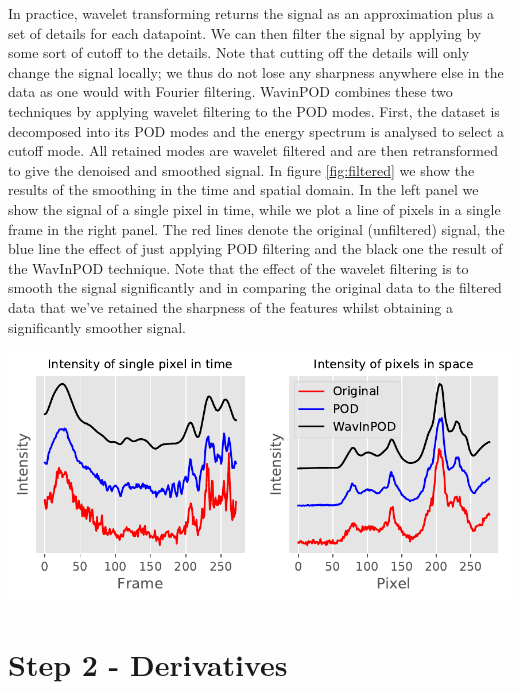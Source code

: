\documentclass{Dissertate}
\let\origfigure\figure
\let\endorigfigure\endfigure
\renewenvironment{figure}[1][2] {
    \expandafter\origfigure\expandafter[H]
} {
    \endorigfigure
}
\begin{document}
 In practice, wavelet transforming returns the signal as an approximation plus a set of details for each datapoint. We can then filter the signal by applying by some sort of cutoff to the details. Note that cutting off the details will only change the signal locally; we thus do not lose any sharpness anywhere else in the data as one would with Fourier filtering.
WavinPOD combines these two techniques by applying wavelet filtering to
the POD modes. First, the dataset is decomposed into its POD modes and the energy spectrum is analysed to select a cutoff mode. All retained
modes are wavelet filtered and are then retransformed to give the
denoised and smoothed signal. In figure \ref{fig:filtered} we show
the results of the smoothing in the time and spatial domain. In the left
panel we show the signal of a single pixel in time, while we plot a line
of pixels in a single frame in the right panel. The red lines denote the
original (unfiltered) signal, the blue line the effect of just applying
POD filtering and the black one the result of the WavInPOD technique. Note that the effect of the wavelet filtering is to smooth the signal
significantly and in comparing the original data to the filtered data
that we've retained the sharpness of the features whilst obtaining a significantly smoother signal.

\begin{figure}
\hypertarget{fig:filtered}{%
\centering
\includegraphics{source/figures/pdf/filtered.pdf}
\caption{Effect of POD with a cutoff of 27 and wavelet filtering with a
level 3 db4 wavelet. Left panel shows the result in the time domain,
right panel in the spatial domain. Lines have been offset for
clarity.}\label{fig:filtered}
}
\end{figure}

\hypertarget{step-2---derivatives}{%
\section{Step 2 - Derivatives}\label{step-2---derivatives}}
\end{document}
